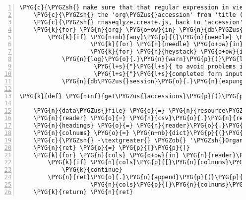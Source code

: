\begin{Verbatim}[commandchars=\\\{\},numbers=left,firstnumber=1,stepnumber=5]
    \PYG{c}{\PYGZsh{} make sure that that regular expression in views.post() that translates}
    \PYG{c}{\PYGZsh{} the 'org\PYGZus{}accession' from 'title (db/accession)', as generated in}
    \PYG{c}{\PYGZsh{} rnaseqlyze.create.js, back to 'accession' doesn't fail}
    \PYG{k}{for} \PYG{n}{org} \PYG{o+ow}{in} \PYG{n}{db\PYGZus{}session}\PYG{o}{.}\PYG{n}{query}\PYG{p}{(}\PYG{n}{UCSCOrganism}\PYG{p}{)}\PYG{o}{.}\PYG{n}{all}\PYG{p}{(}\PYG{p}{)}\PYG{p}{:}
        \PYG{k}{if} \PYG{n+nb}{any}\PYG{p}{(}\PYG{n}{needle} \PYG{o+ow}{in} \PYG{n}{heystack}
                    \PYG{k}{for} \PYG{n}{needle} \PYG{o+ow}{in} \PYG{l+s}{'}\PYG{l+s}{()}\PYG{l+s}{'}
                    \PYG{k}{for} \PYG{n}{heystack} \PYG{o+ow}{in} \PYG{p}{(}\PYG{n}{org}\PYG{o}{.}\PYG{n}{db}\PYG{p}{,} \PYG{n}{org}\PYG{o}{.}\PYG{n}{acc}\PYG{p}{,} \PYG{n}{org}\PYG{o}{.}\PYG{n}{title}\PYG{p}{)}\PYG{p}{)}\PYG{p}{:}
            \PYG{n}{log}\PYG{o}{.}\PYG{n}{warn}\PYG{p}{(}\PYG{l+s}{"}\PYG{l+s}{Droping organism with parentesis}\PYG{l+s}{"}
                     \PYG{l+s}{"}\PYG{l+s}{ to avoid problems in parsing auto}\PYG{l+s}{"}
                     \PYG{l+s}{"}\PYG{l+s}{completed form input in views.post()}\PYG{l+s}{"}\PYG{p}{)}
            \PYG{n}{db\PYGZus{}session}\PYG{o}{.}\PYG{n}{expunge}\PYG{p}{(}\PYG{n}{org}\PYG{p}{)}

\PYG{k}{def} \PYG{n+nf}{get\PYGZus{}accessions}\PYG{p}{(}\PYG{p}{)}\PYG{p}{:}

    \PYG{n}{data\PYGZus{}file} \PYG{o}{=} \PYG{n}{resource\PYGZus{}stream}\PYG{p}{(}\PYG{n}{\PYGZus{}\PYGZus{}name\PYGZus{}\PYGZus{}}\PYG{p}{,} \PYG{n}{prokaryotes\PYGZus{}tsv}\PYG{p}{)}
    \PYG{n}{reader} \PYG{o}{=} \PYG{n}{csv}\PYG{o}{.}\PYG{n}{reader}\PYG{p}{(}\PYG{n}{data\PYGZus{}file}\PYG{p}{,} \PYG{n}{delimiter}\PYG{o}{=}\PYG{l+s}{'}\PYG{l+s+se}{\PYGZbs{}t}\PYG{l+s}{'}\PYG{p}{)}
    \PYG{n}{headings} \PYG{o}{=} \PYG{n}{reader}\PYG{o}{.}\PYG{n}{next}\PYG{p}{(}\PYG{p}{)}
    \PYG{n}{colnums} \PYG{o}{=} \PYG{n+nb}{dict}\PYG{p}{(}\PYG{n+nb}{zip}\PYG{p}{(}\PYG{n}{headings}\PYG{p}{,} \PYG{n+nb}{map}\PYG{p}{(}\PYG{n}{headings}\PYG{o}{.}\PYG{n}{index}\PYG{p}{,} \PYG{n}{headings}\PYG{p}{)}\PYG{p}{)}\PYG{p}{)}
    \PYG{c}{\PYGZsh{} -\textgreater{} \PYGZob{} '\PYGZsh{}Organism/Name': 0, ..., 'Chromosomes/RefSeq': 7 \PYGZcb{}}
    \PYG{n}{ret} \PYG{o}{=} \PYG{p}{[}\PYG{p}{]}
    \PYG{k}{for} \PYG{n}{cols} \PYG{o+ow}{in} \PYG{n}{reader}\PYG{p}{:}
        \PYG{k}{if} \PYG{n}{cols}\PYG{p}{[}\PYG{n}{colnums}\PYG{p}{[}\PYG{l+s}{'}\PYG{l+s}{Chromosomes/RefSeq}\PYG{l+s}{'}\PYG{p}{]}\PYG{p}{]} \PYG{o}{==} \PYG{l+s}{'}\PYG{l+s}{-}\PYG{l+s}{'}\PYG{p}{:}
            \PYG{k}{continue}
        \PYG{n}{ret}\PYG{o}{.}\PYG{n}{append}\PYG{p}{(}\PYG{p}{(}\PYG{n}{cols}\PYG{p}{[}\PYG{n}{colnums}\PYG{p}{[}\PYG{l+s}{'}\PYG{l+s}{\PYGZsh{}Organism/Name}\PYG{l+s}{'}\PYG{p}{]}\PYG{p}{]}\PYG{p}{,}
                    \PYG{n}{cols}\PYG{p}{[}\PYG{n}{colnums}\PYG{p}{[}\PYG{l+s}{'}\PYG{l+s}{Chromosomes/RefSeq}\PYG{l+s}{'}\PYG{p}{]}\PYG{p}{]}\PYG{p}{)}\PYG{p}{)}
    \PYG{k}{return} \PYG{n}{ret}
\end{Verbatim}


